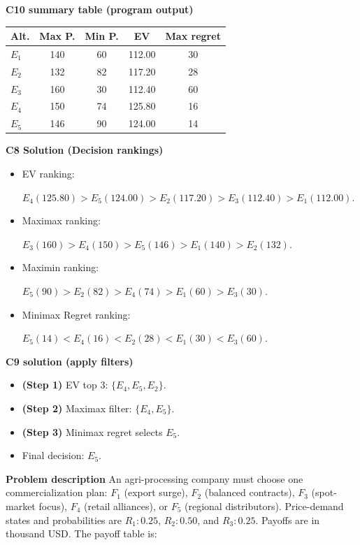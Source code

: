 \begin{ExamProblems}
		\vspace{0.25cm}
		
		\textbf{C10 summary table (program output)}\par
		\begin{center}
			\begin{tabular}{l c c c c}
				\hline
				Alt. & Max P. & Min P. & EV & Max regret \\
				\hline
				$E_1$ & 140 & 60 & 112.00 & 30 \\
				$E_2$ & 132 & 82 & 117.20 & 28 \\
				$E_3$ & 160 & 30 & 112.40 & 60 \\
				$E_4$ & 150 & 74 & 125.80 & 16 \\
				$E_5$ & 146 & 90 & 124.00 & 14 \\
				\hline
			\end{tabular}
		\end{center}
		
		\textbf{C8 Solution (Decision rankings)}\par
		\begin{itemize}
			\item EV ranking: \par $E_4(125.80)>E_5(124.00)>E_2(117.20)>E_3(112.40)>E_1(112.00)$.
			\item Maximax ranking:\par $E_3(160)>E_4(150)>E_5(146)>E_1(140)>E_2(132)$.
			\item Maximin ranking: \par $E_5(90)>E_2(82)>E_4(74)>E_1(60)>E_3(30)$.
			\item Minimax Regret ranking:\par $E_5(14)<E_4(16)<E_2(28)<E_1(30)<E_3(60)$.
		\end{itemize}
		
		\textbf{C9 solution (apply filters)}\par
		\begin{itemize}
			\item \textbf{(Step 1)} EV top 3: $\{E_4,E_5,E_2\}$.
			\item \textbf{(Step 2)} Maximax filter: $\{E_4,E_5\}$.
			\item \textbf{(Step 3)} Minimax regret selects $E_5$.
			\item Final decision: $E_5$.
		\end{itemize}
		
		\newpage
		\item
		\textbf{Problem description}
		An agri-processing company must choose one commercialization plan: $F_1$ (export surge), $F_2$ (balanced contracts), $F_3$ (spot-market focus), $F_4$ (retail alliances), or $F_5$ (regional distributors).
		Price-demand states and probabilities are $R_1:0.25$, $R_2:0.50$, and $R_3:0.25$. Payoffs are in thousand USD. The payoff table is:
		

\end{ExamProblems}
